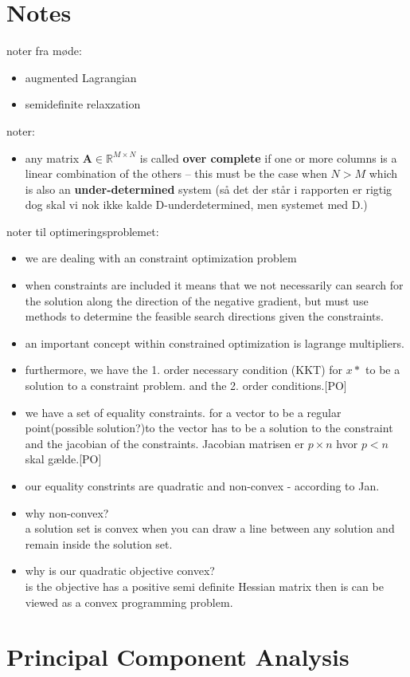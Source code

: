 \section{Notes}
noter fra møde:
\begin{itemize}
\item augmented Lagrangian
\item semidefinite relaxzation 
\end{itemize}
noter:
\begin{itemize}
\item any matrix $\textbf{A}\in \mathbb{R}^{M\times N}$ is called \textbf{over complete} if one or more columns is a linear combination of the others -- this must be the case when $N>M$ which is also an \textbf{under-determined} system (så det der står i rapporten er rigtig dog skal vi nok ikke kalde D-underdetermined, men systemet med D.)
\end{itemize}
noter til optimeringsproblemet: 
\begin{itemize}
\item we are dealing with an constraint optimization problem
\item when constraints are included it means that we not necessarily can search for the solution along the direction of the negative gradient, but must use methods to determine the feasible search directions given the constraints.
\item an important concept within constrained optimization is lagrange multipliers. 
\item furthermore, we have the 1. order necessary condition (KKT) for $x*$ to be a solution to a constraint problem. and the 2. order conditions.[PO]
\item we have a set of equality constraints. for a vector to be a regular point(possible solution?)to the vector has to be a solution to the constraint and the jacobian of the constraints. Jacobian matrisen er $p \times n $ hvor $p<n$ skal gælde.[PO] 
\item our equality constrints are quadratic and non-convex - according to Jan. 
\item why non-convex? \\
a solution set is convex when you can draw a line between any solution and remain inside the solution set. 
\item why is our quadratic objective convex?\\
is the objective has a positive semi definite Hessian matrix then is can be viewed as a convex programming problem. \\
 
\end{itemize}

\section{Principal Component Analysis}
